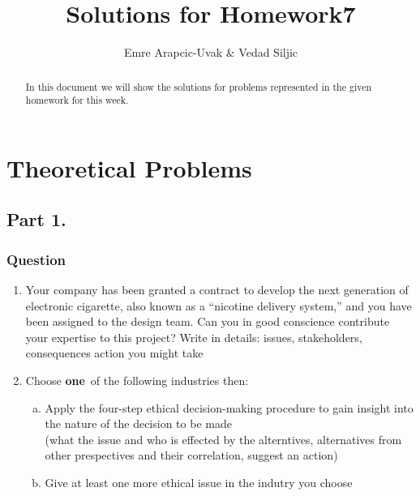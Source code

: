\documentclass[a4paper, 10pt]{article}
\title{Solutions for Homework7}
\author{Emre Arapcic-Uvak & Vedad Siljic}
\date{}
\begin{document}
	\maketitle
	\vspace{5mm}
	
	\begin{abstract}
		\begin{center}
			\noindent In this document we will show the solutions for problems represented in the given homework for this week.
		\end{center}
	\end{abstract}
	\pagebreak
	
	\tableofcontents
	\pagebreak
	
	\section{Theoretical Problems}
		\subsection{Part 1.}
			\subsubsection{Question}
				\begin{enumerate}
					\item \noindent Your company has been granted a contract to develop the next generation of electronic cigarette, also 
					known as a “nicotine delivery system,” and you have been assigned to the design team. Can you in good 
					conscience contribute your expertise to this project? Write in details: issues, stakeholders, 
					consequences action you might take
					
					\item Choose \textbf{one}~of the following industries then:
					\begin{enumerate} [a.]
						\item Apply the four-step ethical decision-making procedure to gain insight into the nature of the decision to be made\\
						\noindent (what the issue and who is effected by the alterntives, alternatives from other prespectives and their correlation, suggest an action)
						
						\item Give at least one more ethical issue in the indutry you choose
					\end{enumerate}
				\end{enumerate}
			
\end{document}

